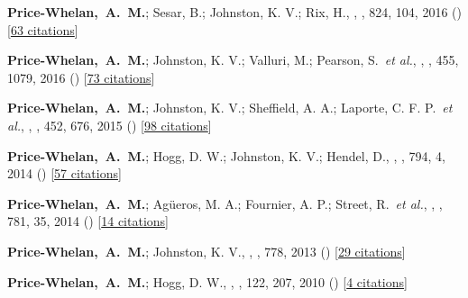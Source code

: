 \item[{\color{deemph}\scriptsize7}]\textbf{Price-Whelan,~A.~M.}; Sesar, B.; Johnston, K. V.; Rix, H., , \apj, 824, 104, 2016 () [\href{http://adsabs.harvard.edu/abs/2016ApJ...824..104P}{63 citations}]

\item[{\color{deemph}\scriptsize6}]\textbf{Price-Whelan,~A.~M.}; Johnston, K. V.; Valluri, M.; Pearson, S.~\textit{et al.}, , \mnras, 455, 1079, 2016 () [\href{http://adsabs.harvard.edu/abs/2016MNRAS.455.1079P}{73 citations}]

\item[{\color{deemph}\scriptsize5}]\textbf{Price-Whelan,~A.~M.}; Johnston, K. V.; Sheffield, A. A.; Laporte, C. F. P.~\textit{et al.}, , \mnras, 452, 676, 2015 () [\href{http://adsabs.harvard.edu/abs/2015MNRAS.452..676P}{98 citations}]

\item[{\color{deemph}\scriptsize4}]\textbf{Price-Whelan,~A.~M.}; Hogg, D. W.; Johnston, K. V.; Hendel, D., , \apj, 794, 4, 2014 () [\href{http://adsabs.harvard.edu/abs/2014ApJ...794....4P}{57 citations}]

\item[{\color{deemph}\scriptsize3}]\textbf{Price-Whelan,~A.~M.}; Ag{\"u}eros, M. A.; Fournier, A. P.; Street, R.~\textit{et al.}, , \apj, 781, 35, 2014 () [\href{http://adsabs.harvard.edu/abs/2014ApJ...781...35P}{14 citations}]

\item[{\color{deemph}\scriptsize2}]\textbf{Price-Whelan,~A.~M.}; Johnston, K. V., , \apj, 778, 2013 () [\href{http://adsabs.harvard.edu/abs/2013ApJ...778L..12P}{29 citations}]

\item[{\color{deemph}\scriptsize1}]\textbf{Price-Whelan,~A.~M.}; Hogg, D. W., , \pasp, 122, 207, 2010 () [\href{http://adsabs.harvard.edu/abs/2010PASP..122..207P}{4 citations}]